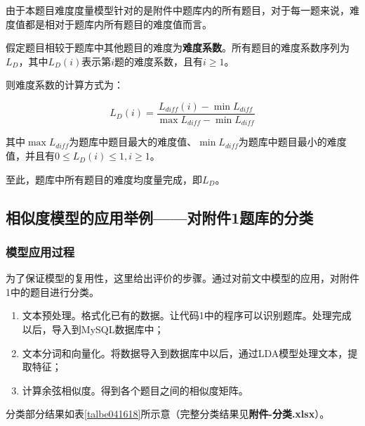 由于本题目难度度量模型针对的是附件中题库内的所有题目，对于每一题来说，难度值都是相对于题库内所有题目的难度值而言。

假定题目相较于题库中其他题目的难度为\textbf{难度系数}。所有题目的难度系数序列为$L_D$，其中$L_D(i)$表示第$i$题的难度系数，且有$i \geq 1$。

则难度系数的计算方式为：

\begin{equation}
L_D(i) = 
    \frac{
        L_{diff}(i) - \min L_{diff}
    } {
        \max L_{diff} - \min L_{diff}
    }
\end{equation}

其中$\max L_{diff}$为题库中题目最大的难度值、$\min L_{diff}$为题库中题目最小的难度值，并且有$0 \leq L_D(i) \leq 1, i \geq 1$。

至此，题库中所有题目的难度均度量完成，即$L_D$。

\subsection{相似度模型的应用举例——对附件1题库的分类}

\subsubsection{模型应用过程}

为了保证模型的复用性，这里给出评价的步骤。通过对前文中模型的应用，对附件1中的题目进行分类。

\begin{enumerate}
    \item 文本预处理。格式化已有的数据。让代码1中的程序可以识别题库。处理完成以后，导入到MySQL数据库中；
    \item 文本分词和向量化。将数据导入到数据库中以后，通过LDA模型处理文本，提取特征；
    \item 计算余弦相似度。得到各个题目之间的相似度矩阵。
\end{enumerate}

分类部分结果如表\ref{talbe041618}所示意（完整分类结果见\textbf{附件-分类.xlsx}）。

